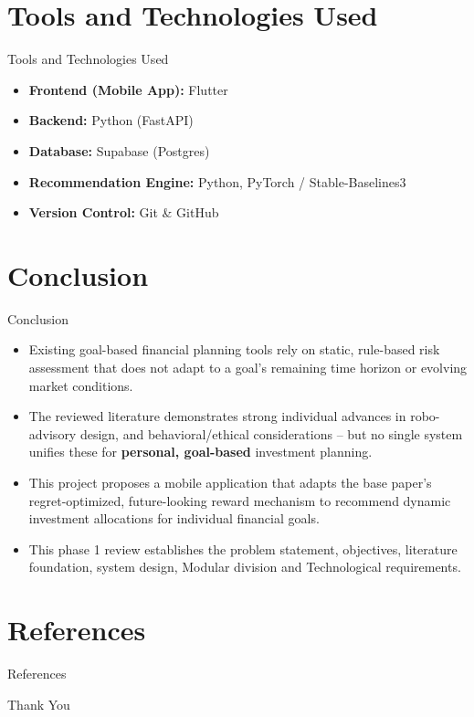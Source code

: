 \documentclass{beamer}
\begin{document}
\section{Tools and Technologies Used}
\begin{frame}{Tools and Technologies Used}
\begin{itemize}
    \item \textbf{Frontend (Mobile App):} Flutter
    \item \textbf{Backend:} Python (FastAPI)
    \item \textbf{Database:} Supabase (Postgres)
    \item \textbf{Recommendation Engine:} Python, PyTorch / Stable-Baselines3
    \item \textbf{Version Control:} Git \& GitHub
\end{itemize}
\medskip
\end{frame}



\section{Conclusion}



\begin{frame}{Conclusion}
\small
\begin{itemize}
    \item Existing goal-based financial planning tools rely on static, rule-based risk assessment that does not adapt to a goal's remaining time horizon or evolving market conditions.
    \item The reviewed literature demonstrates strong individual advances in robo-advisory design, and behavioral/ethical considerations -- but no single system unifies these for \textbf{personal, goal-based} investment planning.
    \item This project proposes a mobile application that adapts the base paper's regret-optimized, future-looking reward mechanism to recommend dynamic investment allocations for individual financial goals.
    \item This phase 1 review establishes the problem statement, objectives, literature foundation, system design, Modular division and Technological requirements.
\end{itemize}
\end{frame}

\section{References}

\begin{frame}[allowframebreaks]{References}
    \nocite{*}
    
    
\end{frame}

\begin{frame}
\centering
\Huge Thank You
\end{frame}
\end{document}
